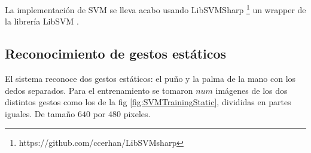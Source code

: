 La implementación de SVM se lleva acabo usando LibSVMSharp \footnote{https://github.com/ccerhan/LibSVMsharp} un wrapper de la librería LibSVM \citep{Chang2011}.

\subsection{Reconocimiento de gestos estáticos}\label{RecognitionEstatic}

El sistema reconoce dos gestos estáticos: el puño y la palma de la mano con los dedos separados.  Para el entrenamiento se tomaron $num$ imágenes de los dos distintos gestos como los de la fig \ref{fig:SVMTrainingStatic}, divididas en partes iguales. De tamaño $640$ por $480$ pixeles.   

\begin{figure}[h!]
\begin{center}
      \quad
{}

\end{center}
\end{figure}
